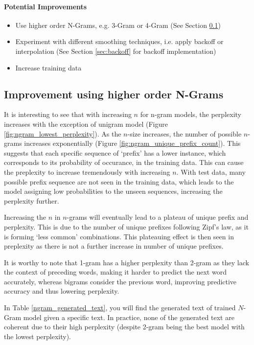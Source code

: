 \paragraph{Potential Improvements}
\begin{itemize}
    \item Use higher order N-Grams, e.g. 3-Gram or 4-Gram (See Section \ref{subsec:improvement-ngrams})
    \item Experiment with different smoothing techniques, i.e. apply backoff or interpolation (See Section \ref{sec:backoff} for backoff implementation)
    \item Increase training data
\end{itemize}


\subsection{Improvement using higher order N-Grams}\label{subsec:improvement-ngrams}
It is interesting to see that with increasing $n$ for n-gram models, the perplexity increases with the exception of unigram model (Figure \ref{fig:ngram_lowest_perplexity}). 
As the $n$-size increases, the number of possible $n$-grams increases exponentially (Figure \ref{fig:ngram_unique_prefix_count}).
This suggests that each specific sequence of `prefix' has a lower instance, which corresponds to its probability of occurance, in the training data. 
This can cause the preplexity to increase tremendously with increasing $n$.
With test data, many possible prefix sequence are not seen in the training data, which leads to the model assigning low probabilities to the unseen sequences, increasing the perplexity further.

Increasing the $n$ in $n$-grams will eventually lead to a plateau of unique prefix and perplexity.
This is due to the number of unique prefixes following Zipf's law, as it is forming `less common' combinations. 
This plateauing effect is then seen in preplexity as there is not a further increase in number of unique prefixes. 

It is worthy to note that 1-gram has a higher perplexity than 2-gram as they lack the context of preceding words, making it harder to predict the next word accurately, whereas bigrams consider the previous word, improving predictive accuracy and thus lowering perplexity.

In Table \ref{ngram_generated_text}, you will find the generated text of trained $N$-Gram model given a specific text. 
In practice, none of the generated text are coherent due to their high perplexity (despite 2-gram being the best model with the lowest perplexity).

